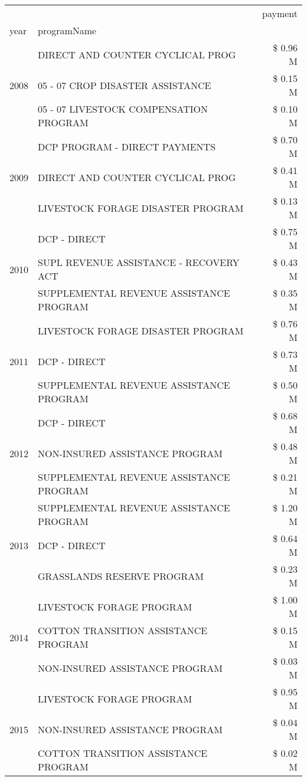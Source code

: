 \begin{tabular}{llr}
\toprule
 &  & payment \\
year & programName &  \\
\midrule
\multirow[t]{3}{*}{2008} & DIRECT AND COUNTER CYCLICAL PROG & \$ 0.96 M \\
 & 05 - 07 CROP DISASTER ASSISTANCE & \$ 0.15 M \\
 & 05 - 07 LIVESTOCK COMPENSATION PROGRAM & \$ 0.10 M \\
\cline{1-3}
\multirow[t]{3}{*}{2009} & DCP PROGRAM - DIRECT PAYMENTS & \$ 0.70 M \\
 & DIRECT AND COUNTER CYCLICAL PROG & \$ 0.41 M \\
 & LIVESTOCK FORAGE DISASTER  PROGRAM & \$ 0.13 M \\
\cline{1-3}
\multirow[t]{3}{*}{2010} & DCP - DIRECT & \$ 0.75 M \\
 & SUPL REVENUE ASSISTANCE - RECOVERY ACT & \$ 0.43 M \\
 & SUPPLEMENTAL REVENUE ASSISTANCE PROGRAM & \$ 0.35 M \\
\cline{1-3}
\multirow[t]{3}{*}{2011} & LIVESTOCK FORAGE DISASTER PROGRAM & \$ 0.76 M \\
 & DCP - DIRECT & \$ 0.73 M \\
 & SUPPLEMENTAL REVENUE ASSISTANCE PROGRAM & \$ 0.50 M \\
\cline{1-3}
\multirow[t]{3}{*}{2012} & DCP - DIRECT & \$ 0.68 M \\
 & NON-INSURED ASSISTANCE PROGRAM & \$ 0.48 M \\
 & SUPPLEMENTAL REVENUE ASSISTANCE PROGRAM & \$ 0.21 M \\
\cline{1-3}
\multirow[t]{3}{*}{2013} & SUPPLEMENTAL REVENUE ASSISTANCE PROGRAM & \$ 1.20 M \\
 & DCP - DIRECT & \$ 0.64 M \\
 & GRASSLANDS RESERVE PROGRAM & \$ 0.23 M \\
\cline{1-3}
\multirow[t]{3}{*}{2014} & LIVESTOCK FORAGE PROGRAM & \$ 1.00 M \\
 & COTTON TRANSITION ASSISTANCE PROGRAM & \$ 0.15 M \\
 & NON-INSURED ASSISTANCE PROGRAM & \$ 0.03 M \\
\cline{1-3}
\multirow[t]{3}{*}{2015} & LIVESTOCK FORAGE PROGRAM & \$ 0.95 M \\
 & NON-INSURED ASSISTANCE PROGRAM & \$ 0.04 M \\
 & COTTON TRANSITION ASSISTANCE PROGRAM & \$ 0.02 M \\

\end{tabular}
